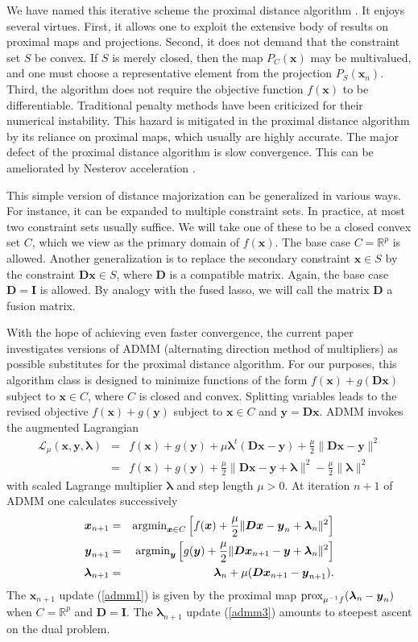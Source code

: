 \documentclass[11pt]{article}
\def\prox{\mathop{\rm prox}\nolimits}
\def\argmin{\mathop{\rm argmin}\nolimits}
\newcommand{\bx}{\boldsymbol{x}}
\newcommand{\by}{\boldsymbol{y}}
\newcommand{\bD}{\boldsymbol{D}}
\newcommand{\bI}{\boldsymbol{I}}
\newcommand{\blambda}{\boldsymbol{\lambda}}
\begin{document}
We have named this iterative scheme the proximal distance algorithm \cite{keys19,lange2016mm}. It enjoys several virtues. 
First, it allows one to exploit the extensive body of results on proximal maps and projections. Second, it does not demand that the constraint set $S$ be convex. If $S$ is merely closed, then the map $P_C(\bx)$ may be multivalued, and one must choose a representative element from the projection $P_S(\bx_n)$. Third, the algorithm does not require the objective function $f(\bx)$ to be differentiable. Traditional penalty methods have been criticized for their numerical instability.  This hazard is mitigated in the proximal distance algorithm by its reliance on proximal maps, which usually are highly accurate.  The major defect of the proximal distance algorithm is slow convergence. This can be ameliorated by Nesterov acceleration \cite{nesterov04}.

This simple version of distance majorization can be generalized in various ways. For instance, it can be expanded to multiple constraint sets. In practice, at most two constraint sets usually suffice. We will take one of these to be a closed convex set $C$, which we view as the primary domain of $f(\bx)$. The base case $C=\mathbb{R}^p$ is allowed.
Another generalization is to replace the secondary constraint 
$\bx \in S$ by the constraint $\bD \bx \in S$, where $\bD$ is a
compatible matrix. Again, the base case $\bD=\bI$ is allowed. By
analogy with the fused lasso, we will call the matrix $\bD$ a fusion
matrix.

With the hope of achieving even faster convergence, the current paper investigates versions of ADMM (alternating direction method of multipliers) \cite{hong2016convergence} as possible substitutes for the 
proximal distance algorithm. For our purposes, this algorithm class is designed to minimize functions of the form $f(\bx)+g(\bD\bx)$ subject to $\bx \in C$, where $C$ is closed and convex. Splitting variables leads to the revised objective $f(\bx)+g(\by)$ subject to $\bx \in C$ and $\by=\bD\bx$. ADMM invokes the augmented Lagrangian
\begin{eqnarray*}
\mathcal{L}_\mu(\bx,\by, \blambda) & = & f(\bx)+ g(\by)
+ \mu \blambda^t(\bD\bx-\by)+\frac{\mu}{2} \|\bD\bx -\by\|^2 \\
& = & f(\bx)+ g(\by)+\frac{\mu}{2} \|\bD\bx -\by+\blambda \|^2 
-\frac{\mu}{2}\|\blambda\|^2
\end{eqnarray*}
with scaled Lagrange multiplier $\blambda$ and step length $\mu>0$. At iteration $n+1$ of ADMM one calculates successively 
\begin{eqnarray}
\bx_{n+1} 
& = & \argmin_{\bx \in C} \Big[f(\bx)+
\frac{\mu}{2} \|\bD\bx-\by_n +\blambda_n \|^2\Big] \label{admm1} \\
\by_{n+1} & = & \argmin_{\by} \Big[g(\by) +
\frac{\mu}{2} \|\bD\bx_{n+1}-\by +\blambda_n \|^2\Big] \label{admm2}\\
\blambda_{n+1} & = & \blambda_n+\mu(\bD\bx_{n+1}-\by_{n+1}). \label{admm3}
\end{eqnarray}
The $\bx_{n+1}$ update (\ref{admm1}) is given by the proximal map 
$\prox_{\mu^{-1}f}(\blambda_n-\by_n)$ when $C=\mathbb{R}^p$ and $\bD=\bI$. The $\blambda_{n+1}$ update (\ref{admm3}) amounts to steepest
ascent on the dual problem.
\end{document}
